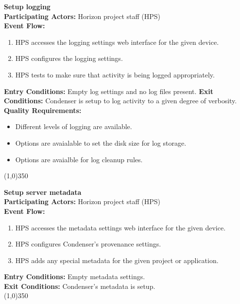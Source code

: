 		\textbf{Setup logging} \\	 
		\textbf{Participating Actors:} Horizon project staff (HPS)  \\
		\textbf{Event Flow:}
		\begin{enumerate}
\item HPS accesses the logging settings web interface for the given device. 
\item HPS configures the logging settings.
\item HPS tests to make sure that activity is being logged appropriately.
	    \end{enumerate}
		\textbf{Entry Conditions:} Empty log settings and no log files present.
		\textbf{Exit Conditions:} Condenser is setup to log activity to a given degree of verbosity.
		\textbf{Quality Requirements:}
		\begin{itemize}
\item Different levels of logging are available.
\item Options are avaialable to set the disk size for log storage.
\item Options are avaialble for log cleanup rules.
		\end{itemize}
		\line(1,0){350}
						 
		\textbf{Setup server metadata} \\
		\textbf{Participating Actors:} Horizon project staff (HPS)  \\
		\textbf{Event Flow:}
		\begin{enumerate}
\item HPS accesses the metadata settings web interface for the given device. 
\item HPS configures Condenser's provenance settings.
\item HPS adds any special metadata for the given project or application.
	    \end{enumerate}
		\textbf{Entry Conditions:} Empty metadata settings.\\
		\textbf{Exit Conditions:} Condenser's metadata is setup.\\
		\line(1,0){350}
				 
